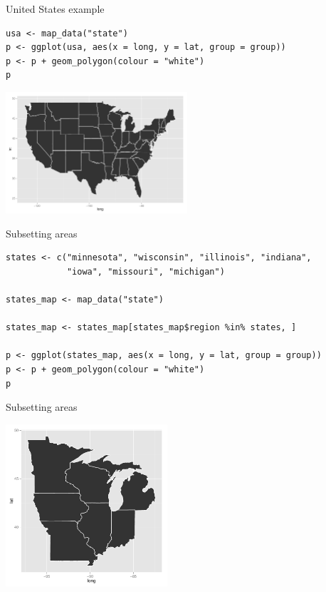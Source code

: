 \documentclass[sans,aspectratio=169,presentation,bigger,fleqn]{beamer}
\begin{document}
\begin{frame}[fragile,label=sec-12]{United States example}
 \scriptsize
\begin{verbatim}
usa <- map_data("state")
p <- ggplot(usa, aes(x = long, y = lat, group = group))
p <- p + geom_polygon(colour = "white")
p
\end{verbatim}

\begin{center}
\includegraphics[height=4.5cm]{./img/usa.pdf}
\end{center}

\normalsize
\end{frame}
\begin{frame}[fragile,label=sec-13]{Subsetting areas}
 \scriptsize
\begin{verbatim}
states <- c("minnesota", "wisconsin", "illinois", "indiana",
            "iowa", "missouri", "michigan")

states_map <- map_data("state")

states_map <- states_map[states_map$region %in% states, ]

p <- ggplot(states_map, aes(x = long, y = lat, group = group))
p <- p + geom_polygon(colour = "white")
p
\end{verbatim}
\end{frame}
\begin{frame}[label=sec-14]{Subsetting areas}
\begin{center}
\includegraphics[height=6cm]{./img/some-states.pdf}
\end{center}
\end{frame}
\end{document}
